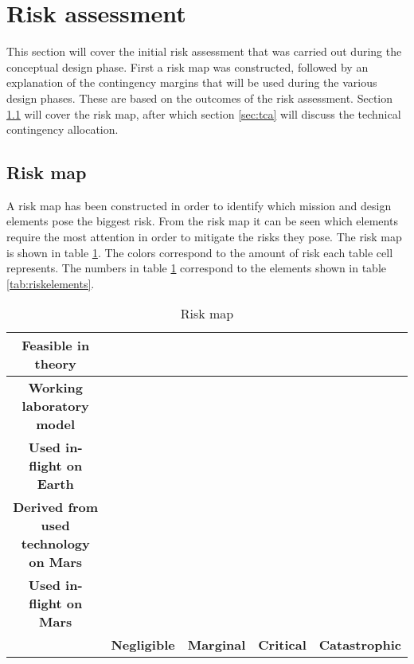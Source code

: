 \section{Risk assessment} 
\label{ch:risk}
This section will cover the initial risk assessment that was carried out during the conceptual design phase. First a risk map was constructed, followed by an explanation of the contingency margins that will be used during the various design phases. These are based on the outcomes of the risk assessment. Section \ref{sec:riskmap} will cover the risk map, after which section \ref{sec:tca} will discuss the technical contingency allocation.

\subsection{Risk map}
\label{sec:riskmap}
 A risk map has been constructed in order to identify which mission and design elements pose the biggest risk. From the risk map it can be seen which elements require the most attention in order to mitigate the risks they pose. The risk map is shown in table \ref{tab:riskmap}. The colors correspond to the amount of risk each table cell represents. The numbers in table \ref{tab:riskmap} correspond to the elements shown in table \ref{tab:riskelements}.

\begin{table}[h]
\centering
\caption{Risk map}
\label{tab:riskmap}
    \begin{tabular}{|c|c|c|c|c|}
    \hline
    \textbf{Feasible in theory} & & & & \\ \hline
    \textbf{Working laboratory model} & & & & \\ \hline
    \textbf{Used in-flight on Earth} & & & & \\ \hline
    \textbf{Derived from used technology on Mars} & & & & \\ \hline
    \textbf{Used in-flight on Mars} & & & & \\ \hline
     & \textbf{Negligible} & \textbf{Marginal} & \textbf{Critical} & \textbf{Catastrophic} \\ \hline
    \end{tabular}
\end{table}

